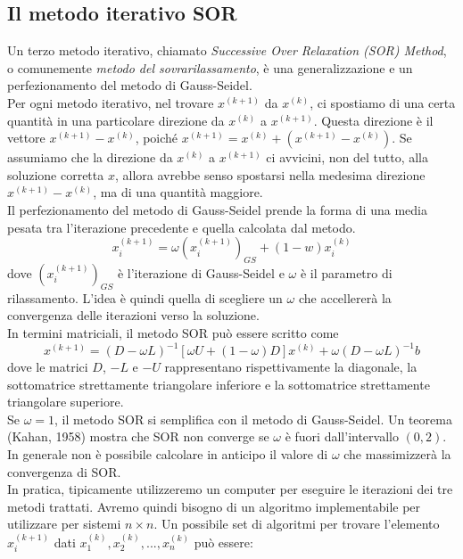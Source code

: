 \documentclass[12pt]{article}
\begin{document}
\subsection{Il metodo iterativo SOR}
Un terzo metodo iterativo, chiamato \textit{Successive Over Relaxation (SOR) Method}, o comunemente \textit{metodo del sovrarilassamento}, è una generalizzazione e un perfezionamento del metodo di Gauss-Seidel. \\Per ogni metodo iterativo, nel trovare \(x^{(k+1)}\) da \(x^{(k)}\), ci spostiamo di una certa quantità in una particolare direzione da \(x^{(k)}\) a \(x^{(k+1)}\). Questa direzione è il vettore \(x^{(k+1)}-x^{(k)}\), poiché \(x^{(k+1)}=x^{(k)}+(x^{(k+1)}-x^{(k)})\). Se assumiamo che la direzione da \(x^{(k)}\) a \(x^{(k+1)}\) ci avvicini, non del tutto, alla soluzione corretta \(x\), allora avrebbe senso spostarsi nella medesima direzione \(x^{(k+1)}-x^{(k)}\), ma di una quantità maggiore. \\Il perfezionamento del metodo di Gauss-Seidel prende la forma di una media pesata tra l'iterazione precedente e quella calcolata dal metodo.
\begin{equation*}
    x_i^{(k+1)} = \omega (x_i^{(k+1)})_{GS} + (1-w)x_i^{(k)}
\end{equation*}
dove \((x_i^{(k+1)})_{GS}\) è l'iterazione di Gauss-Seidel e \(\omega\) è il parametro di rilassamento. L'idea è quindi quella di scegliere un \(\omega\) che accellererà la convergenza delle iterazioni verso la soluzione.\\In termini matriciali, il metodo SOR può essere scritto come
\begin{equation*}
    x^{(k+1)}=(D-\omega L)^{-1}[\omega U+(1-\omega )D]x^{(k)}+\omega(D-\omega L)^{-1}b
\end{equation*}
dove le matrici \(D\), \(-L\) e \(-U\) rappresentano rispettivamente la diagonale, la sottomatrice strettamente triangolare inferiore e la sottomatrice strettamente triangolare superiore.\\ Se \(\omega = 1\), il metodo SOR si semplifica con il metodo di Gauss-Seidel. Un teorema (Kahan, 1958) mostra che SOR non converge se \(\omega\) è fuori dall'intervallo \((0,2)\). In generale non è possibile calcolare in anticipo il valore di \(\omega\) che massimizzerà la convergenza di SOR.\\
In pratica, tipicamente utilizzeremo un computer per eseguire le iterazioni dei tre metodi trattati. Avremo quindi bisogno di un algoritmo implementabile per utilizzare  per sistemi \(n \times n\). Un possibile set di algoritmi per trovare l'elemento \(x_i^{(k+1)}\) dati \(x_1^{(k)},x_2^{(k)},...,x_n^{(k)}\) può essere:
\end{document}
